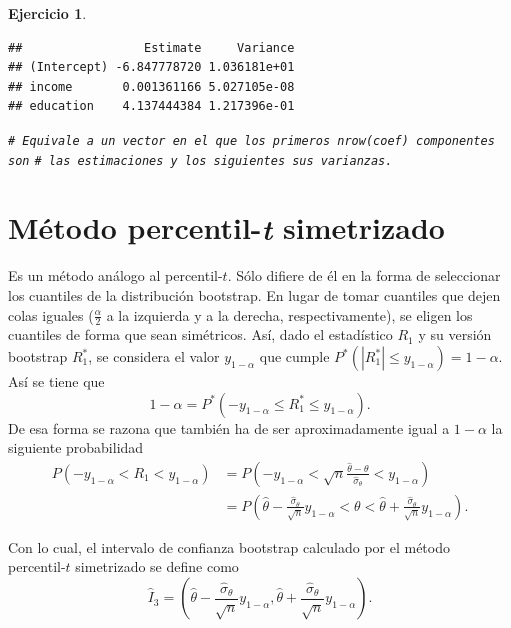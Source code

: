 \documentclass[
]{book}
\newenvironment{Shaded}{\begin{snugshade}}{\end{snugshade}}
\newcommand{\CommentTok}[1]{\textcolor[rgb]{0.56,0.35,0.01}{\textit{#1}}}
\theoremstyle{break}
\newtheorem{exercise}{Ejercicio}[chapter]
\theoremstyle{nonumberplain}
\renewcommand{\CommentTok}[1]{\textcolor[rgb]{0.41,0.41,0.41}{\texttt{#1}}}
\begin{document}
\begin{exercise}
\begin{verbatim}
##                 Estimate     Variance
## (Intercept) -6.847778720 1.036181e+01
## income       0.001361166 5.027105e-08
## education    4.137444384 1.217396e-01
\end{verbatim}

\begin{Shaded}
\begin{Highlighting}[]
\CommentTok{\# Equivale a un vector en el que los primeros \textasciigrave{}nrow(coef)\textasciigrave{} componentes son}
\CommentTok{\# las estimaciones y los siguientes sus varianzas.}
\end{Highlighting}
\end{Shaded}

\end{exercise}

\section{\texorpdfstring{Método percentil-\emph{t} simetrizado}{Método percentil-t simetrizado}}\label{icboot-perc-t-sim}

Es un método análogo al percentil-\(t\). Sólo difiere de él en la forma de
seleccionar los cuantiles de la distribución bootstrap. En lugar de
tomar cuantiles que dejen colas iguales (\(\frac{\alpha }{2}\) a la
izquierda y a la derecha, respectivamente), se eligen los cuantiles de
forma que sean simétricos. Así, dado el estadístico \(R_1\) y su versión
bootstrap \(R_1^{\ast}\), se considera el valor \(y_{1-\alpha }\) que
cumple \(P^{\ast}\left( \left\vert R_1^{\ast}\right\vert
\leq y_{1-\alpha } \right) =1-\alpha\).
Así se tiene que
\[1-\alpha =P^{\ast}\left( -y_{1-\alpha }\leq R_1^{\ast}
\leq y_{1-\alpha} \right).\]
De esa forma se razona que también ha de ser aproximadamente
igual a \(1-\alpha\) la siguiente probabilidad
\[\begin{aligned}
P\left( -y_{1-\alpha }<R_1<y_{1-\alpha } \right) &= P\left( -y_{1-\alpha }
< \sqrt{n}\frac{\hat{\theta}-\theta }{\hat{\sigma}_{\theta }}
< y_{1-\alpha} \right) \\
&= P\left( \hat{\theta}-\frac{\hat{\sigma}_{\theta }}{\sqrt{n}}y_{1-\alpha
}<\theta <\hat{\theta}+\frac{\hat{\sigma}_{\theta }}{\sqrt{n}}y_{1-\alpha
} \right).
\end{aligned}\]

Con lo cual, el intervalo de confianza bootstrap calculado por el método
percentil-\(t\) simetrizado se define como
\[\hat{I}_3=\left( \hat{\theta}-\frac{\hat{\sigma}_{\theta }}{\sqrt{n}}
y_{1-\alpha },\hat{\theta}+\frac{\hat{\sigma}_{\theta }}{\sqrt{n}}
y_{1-\alpha } \right).\]
\end{document}
